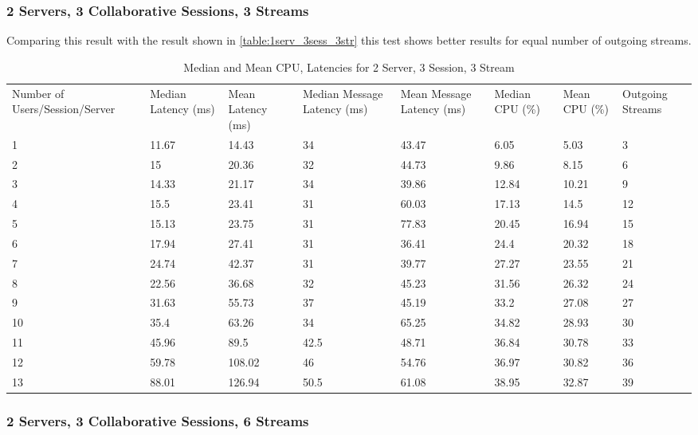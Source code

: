 \subsubsection{2 Servers, 3 Collaborative Sessions, 3 Streams}

Comparing this result with the result shown in \ref{table:1serv_3sess_3str} this test shows better results for equal number of outgoing streams.

\begin{table}
\caption{Median and Mean CPU, Latencies for 2 Server, 3 Session, 3 Stream}
\label{table:2serv_3sess_3str}
\begin{tabu} to\linewidth{|X[c]|X[c]|X[c]|X[c]|X[c]|X[c]|X[c]|X[c]|}
\everyrow{\hline}
\hline
Number of Users/Session/Server & Median Latency (ms) & Mean Latency (ms) & Median Message Latency (ms) & Mean Message Latency (ms) & Median CPU (\%) & Mean CPU (\%) & Outgoing Streams\\
1 & 11.67 & 14.43 & 34 & 43.47 & 6.05 & 5.03 & 3 \\
2 & 15 & 20.36 & 32 & 44.73 & 9.86 & 8.15 & 6 \\
3 & 14.33 & 21.17 & 34 & 39.86 & 12.84 & 10.21 & 9 \\
4 & 15.5 & 23.41 & 31 & 60.03 & 17.13 & 14.5 & 12 \\
5 & 15.13 & 23.75 & 31 & 77.83 & 20.45 & 16.94 & 15 \\
6 & 17.94 & 27.41 & 31 & 36.41 & 24.4 & 20.32 & 18 \\
7 & 24.74 & 42.37 & 31 & 39.77 & 27.27 & 23.55 & 21 \\
8 & 22.56 & 36.68 & 32 & 45.23 & 31.56 & 26.32 & 24 \\
9 & 31.63 & 55.73 & 37 & 45.19 & 33.2 & 27.08 & 27 \\
10 & 35.4 & 63.26 & 34 & 65.25 & 34.82 & 28.93 & 30 \\
11 & 45.96 & 89.5 & 42.5 & 48.71 & 36.84 & 30.78 & 33 \\
12 & 59.78 & 108.02 & 46 & 54.76 & 36.97 & 30.82 & 36 \\
13 & 88.01 & 126.94 & 50.5 & 61.08 & 38.95 & 32.87 & 39 \\
\end{tabu}
\end{table}

\subsubsection{2 Servers, 3 Collaborative Sessions, 6 Streams}

